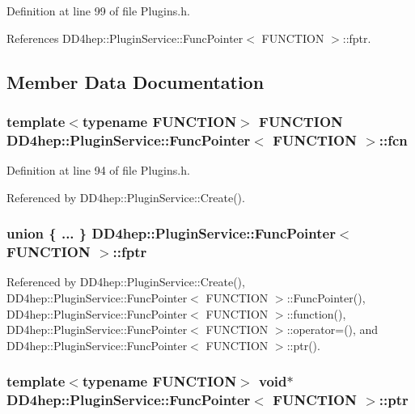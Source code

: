 Definition at line 99 of file Plugins.h.

References DD4hep::PluginService::FuncPointer$<$ FUNCTION $>$::fptr.

\subsection{Member Data Documentation}
\hypertarget{struct_d_d4hep_1_1_plugin_service_1_1_func_pointer_a1858e4504eb3117ff82f6c7c418ff386}{
\subsubsection[{fcn}]{\setlength{\rightskip}{0pt plus 5cm}template$<$typename FUNCTION$>$ FUNCTION {\bf DD4hep::PluginService::FuncPointer}$<$ FUNCTION $>$::{\bf fcn}}}
\label{struct_d_d4hep_1_1_plugin_service_1_1_func_pointer_a1858e4504eb3117ff82f6c7c418ff386}


Definition at line 94 of file Plugins.h.

Referenced by DD4hep::PluginService::Create().\hypertarget{struct_d_d4hep_1_1_plugin_service_1_1_func_pointer_a148afe78c175741c86b0e99e1988562f}{
\subsubsection[{fptr}]{\setlength{\rightskip}{0pt plus 5cm}union \{ ... \}   {\bf DD4hep::PluginService::FuncPointer}$<$ FUNCTION $>$::{\bf fptr}}}
\label{struct_d_d4hep_1_1_plugin_service_1_1_func_pointer_a148afe78c175741c86b0e99e1988562f}


Referenced by DD4hep::PluginService::Create(), DD4hep::PluginService::FuncPointer$<$ FUNCTION $>$::FuncPointer(), DD4hep::PluginService::FuncPointer$<$ FUNCTION $>$::function(), DD4hep::PluginService::FuncPointer$<$ FUNCTION $>$::operator=(), and DD4hep::PluginService::FuncPointer$<$ FUNCTION $>$::ptr().\hypertarget{struct_d_d4hep_1_1_plugin_service_1_1_func_pointer_a2de222ee867b2669e86af39351a05a68}{
\subsubsection[{ptr}]{\setlength{\rightskip}{0pt plus 5cm}template$<$typename FUNCTION$>$ void$\ast$ {\bf DD4hep::PluginService::FuncPointer}$<$ FUNCTION $>$::{\bf ptr}}}
\label{struct_d_d4hep_1_1_plugin_service_1_1_func_pointer_a2de222ee867b2669e86af39351a05a68}


